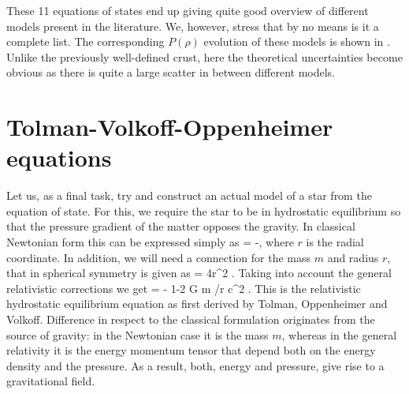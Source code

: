 These 11 equations of states end up giving quite good overview of different models present in the literature.
We, however, stress that by no means is it a complete list.
The corresponding $P(\rho)$ evolution of these models is shown in .
Unlike the previously well-defined crust, here the theoretical uncertainties become obvious as there is quite a large scatter in between different models.


\section{Tolman-Volkoff-Oppenheimer equations}
Let us, as a final task, try and construct an actual model of a star from the equation of state.
For this, we require the star to be in hydrostatic equilibrium so that the pressure gradient of the matter opposes the gravity.
In classical Newtonian form this can be expressed simply as
\be\label{eq:hydrobal}
 = -,
\ee
where $r$ is the radial coordinate.
In addition, we will need a connection for the mass $m$ and radius $r$, that in spherical symmetry is given as
\be
{} = 4\pi r^2 \rho.
\ee
Taking into account the general relativistic corrections we get
\be\label{eq:hydrobalGR}
 = 
    - \times 
    {1-2 G m /r c^2 }.
\ee
This is the relativistic hydrostatic equilibrium equation as first derived by Tolman\cite{Tolman39}, Oppenheimer and Volkoff\cite{OV39}.
Difference in respect to the classical formulation originates from the source of gravity:
in the Newtonian case it is the mass $m$, whereas in the general relativity it is the energy momentum tensor that depend both on the energy density and the pressure.
As a result, both, energy and pressure, give rise to a gravitational field.


